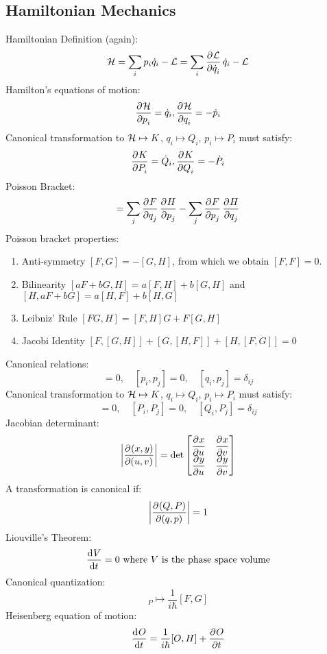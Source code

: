 \subsection{Hamiltonian Mechanics}
Hamiltonian Definition (again):
\begin{equation}
    \HH = \sum_i p_i\dot{q}_i - \LL = \sum_i \dpd{\LL}{\dot{q}_i}\dot{q}_i - \LL
\end{equation}
Hamilton's equations of motion:
\begin{equation}
    \dpd{\HH}{p_i} = \dot{q}_i, \dpd{\HH}{q_i} = -\dot{p}_i
\end{equation}
Canonical transformation to $\mathcal{H} \mapsto K$, $q_i \mapsto Q_i$, $p_i \mapsto P_i$ must satisfy:
\begin{equation}
    \dpd{K}{P_i} = \dot{Q}_i, \dpd{K}{Q_i} = -\dot{P}_i
\end{equation}
Poisson Bracket:
\begin{equation}
    [F, H] = \sum_j \dpd{F}{q_j}\dpd{H}{p_j} - \sum_j \dpd{F}{p_j}\dpd{H}{q_j}
\end{equation}
Poisson bracket properties:
\begin{enumerate}
    \item Anti-symmetry $[F, G] = -[G, H]$, from which we obtain $[F, F] = 0$.
    \item Bilinearity $[aF + bG, H] = a[F, H] + b[G, H]$ and $[H, aF + bG] = a[H, F] + b[H, G]$
    \item Leibniz' Rule $[FG, H] = [F, H]G + F[G, H]$
    \item Jacobi Identity $[F, [G, H]] + [G, [H, F]] + [H, [F, G]] = 0$
\end{enumerate}
Canonical relations:
\begin{equation}
    [q_i, q_j] = 0,\quad [p_i, p_j] = 0, \quad [q_i, p_j] = \delta_{ij}
\end{equation}
Canonical transformation to $\mathcal{H} \mapsto K$, $q_i \mapsto Q_i$, $p_i \mapsto P_i$ must satisfy:
\begin{equation}
    [Q_i, Q_j] = 0,\quad [P_i, P_j] = 0, \quad [Q_i, P_j] = \delta_{ij}
\end{equation}
Jacobian determinant:
\begin{equation}
    \abs{\dpd{(x, y)}{(u, v)}} = \det \m{\dpd{x}{u} & \dpd{x}{v} \\ \dpd{y}{u} & \dpd{y}{v}}
\end{equation}
A transformation is canonical if:
\begin{equation}
    \abs{\dpd{(Q, P)}{(q, p)}} = 1
\end{equation}
Liouville's Theorem:
\begin{equation}
    \dod{V}{t} = 0 \text{ where $V$ is the phase space volume}
\end{equation}
Canonical quantization:
\begin{equation}
    [F, G]_P \mapsto \frac{1}{i\hbar}[F, G]
\end{equation}
Heisenberg equation of motion:
\begin{equation}
    \dod{O}{t} = \frac{1}{i\hbar}[O, H] + \dpd{O}{t}
\end{equation}
